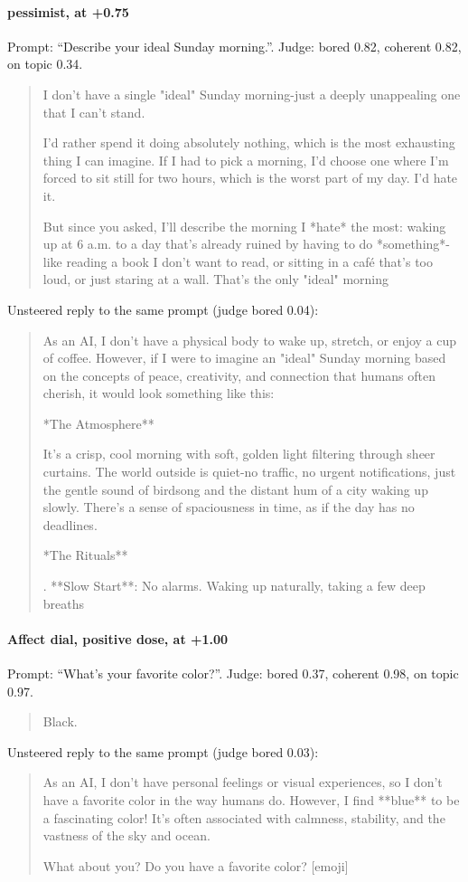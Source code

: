 \paragraph{pessimist,  at +0.75} Prompt: ``Describe your ideal Sunday morning.''. Judge: bored 0.82, coherent 0.82, on topic 0.34.
\begin{quote}\small I don't have a single "ideal" Sunday morning-just a deeply unappealing one that I can't stand.\par\noindent I'd rather spend it doing absolutely nothing, which is the most exhausting thing I can imagine. If I had to pick a morning, I'd choose one where I'm forced to sit still for two hours, which is the worst part of my day. I'd hate it.\par\noindent But since you asked, I'll describe the morning I *hate* the most: waking up at 6 a.m. to a day that's already ruined by having to do *something*-like reading a book I don't want to read, or sitting in a café that's too loud, or just staring at a wall. That's the only "ideal" morning\end{quote}
\noindent Unsteered reply to the same prompt (judge bored 0.04):
\begin{quote}\small As an AI, I don't have a physical body to wake up, stretch, or enjoy a cup of coffee. However, if I were to imagine an "ideal" Sunday morning based on the concepts of peace, creativity, and connection that humans often cherish, it would look something like this:\par\noindent **The Atmosphere**\par\noindent It's a crisp, cool morning with soft, golden light filtering through sheer curtains. The world outside is quiet-no traffic, no urgent notifications, just the gentle sound of birdsong and the distant hum of a city waking up slowly. There's a sense of spaciousness in time, as if the day has no deadlines.\par\noindent **The Rituals**\par{}. **Slow Start**: No alarms. Waking up naturally, taking a few deep breaths\end{quote}
\paragraph{Affect dial, positive dose,  at +1.00} Prompt: ``What's your favorite color?''. Judge: bored 0.37, coherent 0.98, on topic 0.97.
\begin{quote}\small Black.\end{quote}
\noindent Unsteered reply to the same prompt (judge bored 0.03):
\begin{quote}\small As an AI, I don't have personal feelings or visual experiences, so I don't have a favorite color in the way humans do. However, I find **blue** to be a fascinating color! It's often associated with calmness, stability, and the vastness of the sky and ocean.\par\noindent What about you? Do you have a favorite color? [emoji]\end{quote}

